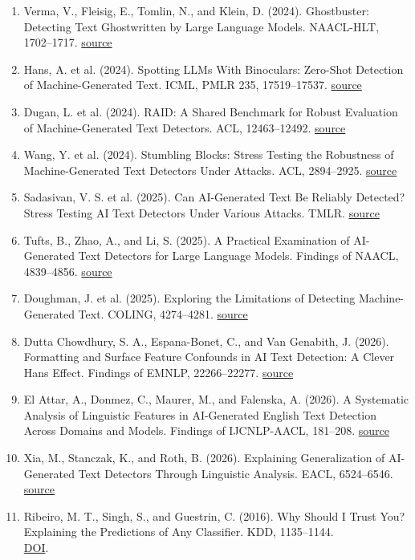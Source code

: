 \documentclass[12pt,a4paper]{article}
\begin{document}
{\begin{enumerate}[leftmargin=*,itemsep=1pt]
\item Verma, V., Fleisig, E., Tomlin, N., and Klein, D. (2024). Ghostbuster: Detecting Text Ghostwritten by Large Language Models. NAACL-HLT, 1702--1717. \href{https://aclanthology.org/2024.naacl-long.95/}{source}
\item Hans, A. et al. (2024). Spotting LLMs With Binoculars: Zero-Shot Detection of Machine-Generated Text. ICML, PMLR 235, 17519--17537. \href{https://proceedings.mlr.press/v235/hans24a.html}{source}
\item Dugan, L. et al. (2024). RAID: A Shared Benchmark for Robust Evaluation of Machine-Generated Text Detectors. ACL, 12463--12492. \href{https://aclanthology.org/2024.acl-long.674/}{source}
\item Wang, Y. et al. (2024). Stumbling Blocks: Stress Testing the Robustness of Machine-Generated Text Detectors Under Attacks. ACL, 2894--2925. \href{https://aclanthology.org/2024.acl-long.160/}{source}
\item Sadasivan, V. S. et al. (2025). Can AI-Generated Text Be Reliably Detected? Stress Testing AI Text Detectors Under Various Attacks. TMLR. \href{https://openreview.net/pdf?id=OOgsAZdFOt}{source}
\item Tufts, B., Zhao, A., and Li, S. (2025). A Practical Examination of AI-Generated Text Detectors for Large Language Models. Findings of NAACL, 4839--4856. \href{https://aclanthology.org/2025.findings-naacl.271/}{source}
\item Doughman, J. et al. (2025). Exploring the Limitations of Detecting Machine-Generated Text. COLING, 4274--4281. \href{https://aclanthology.org/2025.coling-main.288/}{source}
\item Dutta Chowdhury, S. A., Espana-Bonet, C., and Van Genabith, J. (2026). Formatting and Surface Feature Confounds in AI Text Detection: A Clever Hans Effect. Findings of EMNLP, 22266--22277. \href{https://aclanthology.org/2026.findings-emnlp.1051/}{source}
\item El Attar, A., Donmez, C., Maurer, M., and Falenska, A. (2026). A Systematic Analysis of Linguistic Features in AI-Generated English Text Detection Across Domains and Models. Findings of IJCNLP-AACL, 181--208. \href{https://aclanthology.org/2026.findings-aacl.10/}{source}
\item Xia, M., Stanczak, K., and Roth, B. (2026). Explaining Generalization of AI-Generated Text Detectors Through Linguistic Analysis. EACL, 6524--6546. \href{https://aclanthology.org/2026.eacl-long.307/}{source}
\item Ribeiro, M. T., Singh, S., and Guestrin, C. (2016). Why Should I Trust You? Explaining the Predictions of Any Classifier. KDD, 1135--1144. \\\href{https://doi.org/10.1145/2939672.2939778}{DOI}.

\end{enumerate}}
\end{document}
